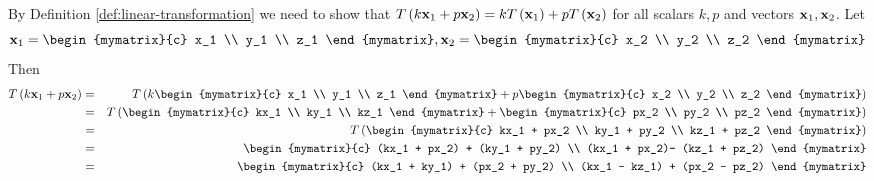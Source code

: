 \begin{solution}
By Definition \ref{def:linear-transformation} we need to show that $T\left(k \mbox{\bf x}_1 + p \mbox{\bf x}_2 \right) = kT\left(\mbox{\bf x}_1\right)+ pT\left(\mbox{\bf x}_{2} \right)$ for all scalars $k,p$ and vectors $\mbox{\bf x}_1, \mbox{\bf x}_2$.
Let
\[
\vect{x}_1 = \begin{mymatrix}{c} x_1 \\ y_1 \\ z_1 \end{mymatrix}, 
\vect{x}_2 = \begin{mymatrix}{c} x_2 \\ y_2 \\ z_2 \end{mymatrix}
\]
Then
\begin{eqnarray*}
T\tup{k \vect{x}_1 + p \vect{x}_2 } &=& T \tup{k \begin{mymatrix}{c} x_1 \\ y_1 \\ z_1 \end{mymatrix} + p \begin{mymatrix}{c} x_2 \\ y_2 \\ z_2 \end{mymatrix} } \\
&=& T \tup{\begin{mymatrix}{c} kx_1 \\ ky_1 \\ kz_1 \end{mymatrix} +  \begin{mymatrix}{c} px_2 \\ py_2 \\ pz_2 \end{mymatrix} } \\
&=& T \tup{\begin{mymatrix}{c} kx_1 + px_2 \\ ky_1 + py_2 \\ kz_1 + pz_2 \end{mymatrix}  } \\
&=& \begin{mymatrix}{c} (kx_1 + px_2) + (ky_1 + py_2) \\ (kx_1 + px_2)- (kz_1 + pz_2) \end{mymatrix} \\
&=& \begin{mymatrix}{c} (kx_1 + ky_1) + (px_2 + py_2) \\ (kx_1 - kz_1) + (px_2 - pz_2) \end{mymatrix} \\

\end{eqnarray*}
\end{solution}
